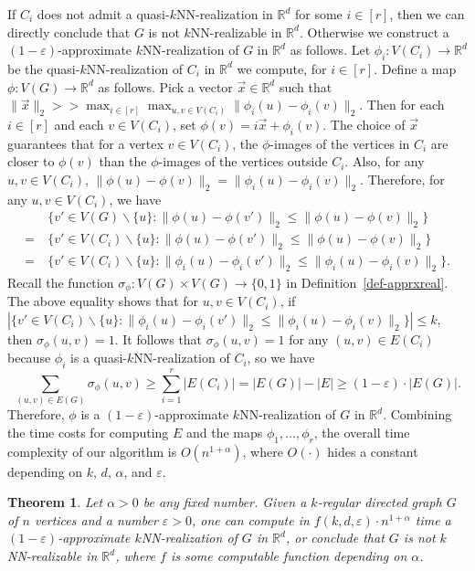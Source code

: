 \documentclass[11pt]{article}
\newtheorem{theorem}{Theorem}
\begin{document}
If $C_i$ does not admit a quasi-$k$NN-realization in $\mathbb{R}^d$ for some $i \in [r]$, then we can directly conclude that $G$ is not $k$NN-realizable in $\mathbb{R}^d$.
Otherwise we construct a $(1-\varepsilon)$-approximate $k$NN-realization of $G$ in $\mathbb{R}^d$ as follows.
Let $\phi_i:V(C_i) \rightarrow \mathbb{R}^d$ be the quasi-$k$NN-realization of $C_i$ in $\mathbb{R}^d$ we compute, for $i \in [r]$.
Define a map $\phi:V(G) \rightarrow \mathbb{R}^d$ as follows.
Pick a vector $\vec{x} \in \mathbb{R}^d$ such that $\lVert \vec{x} \rVert_2 >> \max_{i \in [r]} \max_{u,v \in V(C_i)} \lVert \phi_i(u) - \phi_i(v) \rVert_2$.
Then for each $i \in [r]$ and each $v \in V(C_i)$, set $\phi(v) = i \vec{x} + \phi_i(v)$.
The choice of $\vec{x}$ guarantees that for a vertex $v \in V(C_i)$, the $\phi$-images of the vertices in $C_i$ are closer to $\phi(v)$ than the $\phi$-images of the vertices outside $C_i$.
Also, for any $u,v \in V(C_i)$, $\lVert \phi(u) - \phi(v) \rVert_2 = \lVert \phi_i(u) - \phi_i(v) \rVert_2$.
Therefore, for any $u,v \in V(C_i)$, we have
\begin{align*}
    & \ \{v' \in V(G) \backslash \{u\}: \lVert \phi(u) - \phi(v') \rVert_2 \leq \lVert \phi(u) - \phi(v) \rVert_2\} \\
    = & \ \{v' \in V(C_i) \backslash \{u\}: \lVert \phi(u) - \phi(v') \rVert_2 \leq \lVert \phi(u) - \phi(v) \rVert_2\} \\
    = & \ \{v' \in V(C_i) \backslash \{u\}: \lVert \phi_i(u) - \phi_i(v') \rVert_2 \leq \lVert \phi_i(u) - \phi_i(v) \rVert_2\}.
\end{align*}
Recall the function $\sigma_\phi:V(G) \times V(G) \rightarrow \{0,1\}$ in Definition~\ref{def-apprxreal}.
The above equality shows that for $u,v \in V(C_i)$, if $|\{v' \in V(C_i) \backslash \{u\}: \lVert \phi_i(u) - \phi_i(v') \rVert_2 \leq \lVert \phi_i(u) - \phi_i(v) \rVert_2\}| \leq k$, then $\sigma_\phi(u,v) = 1$.
It follows that $\sigma_\phi(u,v) = 1$ for any $(u,v) \in E(C_i)$ because $\phi_i$ is a quasi-$k$NN-realization of $C_i$,
so we have
\begin{equation*}
    \sum_{(u,v) \in E(G)} \sigma_\phi(u,v) \geq \sum_{i=1}^r |E(C_i)| = |E(G)| - |E| \geq (1-\varepsilon) \cdot |E(G)|.
\end{equation*}
Therefore, $\phi$ is a $(1-\varepsilon)$-approximate $k$NN-realization of $G$ in $\mathbb{R}^d$.
Combining the time costs for computing $E$ and the maps $\phi_1,\dots,\phi_r$, the overall time complexity of our algorithm is $O(n^{1+\alpha})$, where $O(\cdot)$ hides a constant depending on $k$, $d$, $\alpha$, and $\varepsilon$.
\begin{theorem}
Let $\alpha > 0$ be any fixed number.
Given a $k$-regular directed graph $G$ of $n$ vertices and a number $\varepsilon > 0$, one can compute in $f(k,d,\varepsilon) \cdot n^{1+\alpha}$ time a $(1-\varepsilon)$-approximate $k$NN-realization of $G$ in $\mathbb{R}^d$, or conclude that $G$ is not $k$NN-realizable in $\mathbb{R}^d$, where $f$ is some computable function depending on $\alpha$.
\end{theorem}
\end{document}
